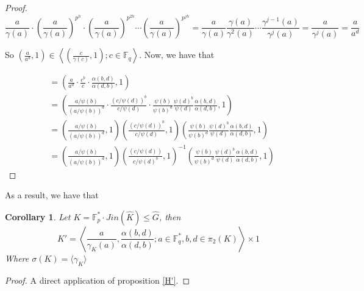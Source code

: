 \documentclass{article}
\newtheorem{corollary}[theorem]{Corollary}
\begin{document}
\begin{proof}
\begin{equation}
\frac{a}{\gamma(a)} \cdot \left(\frac{a}{\gamma(a)} \right)^{p^h} \cdot \left(\frac{a}{\gamma(a)} \right)^{p^{2h}} \cdots \left(\frac{a}{\gamma(a)} \right)^{p^{jh}} = \frac{a}{\gamma(a)} \frac{\gamma(a)}{\gamma^2(a)} \cdots \frac{\gamma^{j-1}(a)}{\gamma^j(a)} = \frac{a}{\gamma^j(a)} = \frac{a}{a^d}
\end{equation}

So $\left(\frac{a}{a^d},1 \right) \in \left \langle \left(\frac{c}{\gamma(c)}, 1 \right) ; c\in \mathbb{F}_q \right \rangle$. Now, we have that 

\begin{align*}
        [(a,b), (c,d)] 
         & = \left( \frac{a}{a^d} \cdot \frac{c^b}{c} \cdot \frac{\alpha(b,d) }{\alpha(d,b)},1\right)  \\
         & = \left( \frac{a/\psi(b)}{(a/\psi(b))^d} \cdot \frac{(c/\psi(d))^b}{c/\psi(d)} \cdot \frac{\psi(b)}{\psi(b)^d} \frac{\psi(d)^b}{\psi(d)}\frac{\alpha(b,d) }{\alpha(d,b)},1\right)  \\
         & = \left( \frac{a/\psi(b)}{(a/\psi(b))^d} , 1\right)\left( \frac{(c/\psi(d))^b}{c/\psi(d)}  , 1\right) \left(\frac{\psi(b)}{\psi(b)^d} \frac{\psi(d)^b}{\psi(d)}\frac{\alpha(b,d) }{\alpha(d,b)},1 \right)
         \\
         & = \left( \frac{a/\psi(b)}{(a/\psi(b))^d} , 1\right)\left( \frac{(c/\psi(d))}{c/\psi(d)^b}  , 1\right)^{-1} \left(\frac{\psi(b)}{\psi(b)^d} \frac{\psi(d)^b}{\psi(d)}\frac{\alpha(b,d) }{\alpha(d,b)},1 \right)
    \end{align*} 
\end{proof}

As a result, we have that 
\begin{corollary} 
    Let $K=\mathbb{F}_p^* \cdot Jin(\hat{K}) \leq \hat{G}$, then 
     \begin{equation}
        K' = \left\langle \frac{a}{\gamma_K(a)}, \frac{\alpha(b,d) }{\alpha(d,b)}; a\in  \mathbb{F}_q^*, b,d \in \pi_2(K) \right\rangle \times {1}
    \end{equation}
Where $\sigma(K) = \langle \gamma_K\rangle$
\end{corollary}
\begin{proof}
    A direct application of proposition \ref{H'}.
\end{proof}
\end{document}
